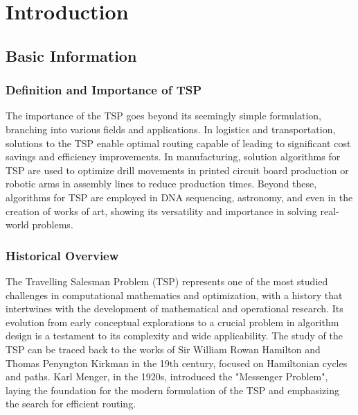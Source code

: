 
%

\chapter{Introduction}
\label{chapt:1}


\epigraphfontsize{\small\itshape}
\setlength\epigraphwidth{12.5cm}
\setlength\epigraphrule{0pt}

\section{Basic Information}

\subsection{Definition and Importance of TSP}

The importance of the \Gls{TSP} goes beyond its seemingly simple formulation, branching into various fields and applications. In logistics and transportation,
solutions to the \Gls{TSP} enable optimal routing capable of leading to
significant cost savings and efficiency improvements. In
manufacturing, solution algorithms for \Gls{TSP} are used to optimize
drill movements in printed circuit board production or robotic
arms in assembly lines to reduce production times.
Beyond these, algorithms for \Gls{TSP} are employed in DNA
sequencing, astronomy, and even in the creation of works of art, showing
its versatility and importance in solving real-world problems.

\subsection{Historical Overview}

The Travelling Salesman Problem (\Gls{TSP}) represents one of the most studied challenges in computational mathematics and optimization, with a history that intertwines with the development of mathematical and operational research. Its evolution from early conceptual explorations to a crucial problem in algorithm design is a testament to its complexity and wide applicability.
The study of the \Gls{TSP} can be traced back to the works of Sir William Rowan Hamilton and Thomas Penyngton Kirkman in the 19th century, focused on Hamiltonian cycles and paths. Karl Menger, in the 1920s, introduced the "Messenger Problem", laying the foundation for the modern formulation of the \Gls{TSP} and emphasizing the search for efficient routing.

